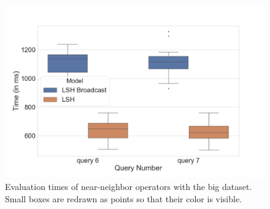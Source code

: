 \documentclass[a4paper,10pt]{IEEEtran}
\begin{document}
\begin{figure}[!ht]
    \centering
    \includegraphics[width=\linewidth]{"lsh_big.png"}
    \caption{Evaluation times of near-neighbor operators with the big dataset. Small boxes are redrawn as points so that their color is visible.}
    \label{fig:lsh-big}
\end{figure}
\end{document}
